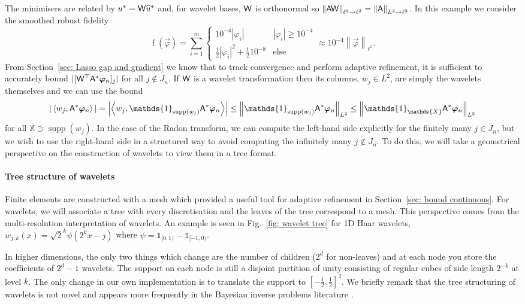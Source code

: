\documentclass[smallextended]{svjour3}
\let\F\mathds\let\C\mathcal\newcommand{\R}{\F{R}}\newcommand{\A}{\tens{A}}
\newcommand{\norm}[1]{{\left\lVert #1 \right\rVert}}
\newcommand{\IP}[2]{\left\langle #1,#2 \right\rangle}
\newcommand{\op}[1]{\operatorname{#1}}
\newcommand{\splitln}[4]{\begin{cases} #1 & #2 \\ #3 & #4\end{cases}}
\newcommand{\1}{\F{1}}
\renewcommand{\hat}{\widehat}\renewcommand{\tilde}{\widetilde}
\DeclareMathOperator{\supp}{supp}
\newcommand*{\var}[1]{%
	\IfEqCase{#1}{%
		{0}{u}%
		{1}{v}%
		{2}{w}%
	}[u#1]%
}
\begin{document}
	The minimisers are related by $\var0^* = \tens{W}\hat{\var0}^*$ and, for wavelet bases, $\mathsf{W}$ is orthonormal so $\norm{\A\tens{W}}_{\ell^2\to\ell^2} = \norm{\A}_{L^2\to\ell^2}$. 
	 In this example we consider the smoothed robust fidelity \cite{Rosset2007}
		\begin{equation}
			\op{f}(\vec{\varphi}) = \sum_{i=1}^m \splitln{10^{-4}|\varphi_i|}{|\varphi_i|\geq10^{-4}}{\tfrac12|\varphi_i|^2+\tfrac12 10^{-8}}{\text{else}} \approx 10^{-4}\norm{\vec{\varphi}}_{\ell^1}.
		\end{equation}
	From Section~\ref{sec: Lasso gap and gradient} we know that to track convergence and perform adaptive refinement, it is sufficient to accurately bound $|[\tens{W}^\top \A^*\vec{\varphi}_n]_j|$ for all $j\notin J_n$. If $\mathsf{W}$ is a wavelet transformation then its columns, $w_j\in L^2$, are simply the wavelets themselves and we can use the bound 
	\begin{equation}
		|\IP{w_j}{\A^*\vec{\varphi}_n}| = \left|\IP{w_j}{\1_{\supp(w_j)}\A^*\vec{\varphi}_n}\right| \leq \norm{\1_{\supp(w_j)} \A^*\vec{\varphi}_n}_{L^2}\leq \norm{\1_{\F{X}} \A^*\vec{\varphi}_n}_{L^2}
	\end{equation}
	for all $\F{X}\supset \supp(w_j)$.
	In the case of the Radon transform, we can compute the left-hand side explicitly for the finitely many $j\in J_n$, but we wish to use the right-hand side in a structured way to avoid computing the infinitely many $j\notin J_n$. To do this, we will take a geometrical perspective on the construction of wavelets to view them in a tree format. 
	
	\paragraph{Tree structure of wavelets}
	Finite elements are constructed with a mesh which provided a useful tool for adaptive refinement in Section~\ref{sec: bound continuous}. For wavelets, we will associate a tree with every discretisation and the leaves of the tree correspond to a mesh. This perspective comes from the multi-resolution interpretation of wavelets. An example is seen in Fig.~\ref{fig: wavelet tree} for 1D Haar wavelets, $w_{j,k}(x) = \sqrt{2}^k\psi(2^{k}x-j)$ where $\psi = \1_{[0,1)} - \1_{[-1,0)}$. 
	
	In higher dimensions, the only two things which change are the number of children ($2^d$ for non-leaves) and at each node you store the coefficients of $2^d-1$ wavelets. The support on each node is still a disjoint partition of unity consisting of regular cubes of side length $2^{-k}$ at level $k$. The only change in our own implementation is to translate the support to $[-\tfrac12,\tfrac12]^2$. We briefly remark that the tree structuring of wavelets is not novel and appears more frequently in the Bayesian inverse problems literature \cite{Castillo2019,Kekkonen2021}.
	
\end{document}
